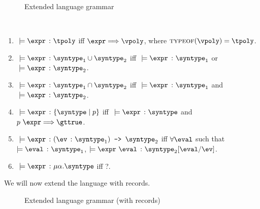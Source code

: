 \begin{figure}[hbt!]%
  \begin{grammar}
            \grule[expressions]{\expr}{
              \cdots
              \gor \vpoly
            }
            \grule[values]{\eval}{
              \cdots
              \gor \vpoly
            }
            \grule[types]{\syntype}{
              \cdots
              \gor \tpoly
              \gor \mkunion{\syntype}{\syntype}
              \gor \mkintersect{\syntype}{\syntype}
              \gor \mktset{\syntype}{\expr}
              \gor \mkdfun{\ev}{\syntype}{\syntype}
              \gor \mkmiu{\alpha}{\syntype}
          }
        \end{grammar}
    \caption{Extended language grammar}
    \label{ext_Grammar}
\end{figure}

\begin{definition}
  \label{def_typingRulesExt}
  \ \par
  \begin{enumerate}
      \item $\ \models \hastype{\expr}{\tpoly}$ iff $\expr \bigstep \vpoly$, where $\textsc{typeof}(\vpoly) = \tpoly$.
      \item $\ \models \hastype{\expr}{\mkunion{\syntype_1}{\syntype_2}}$ iff $\ \models \hastype{\expr}{\syntype_1}$ or $\ \models \hastype{\expr}{\syntype_2}$.
      \item $\ \models \hastype{\expr}{\mkintersect{\syntype_1}{\syntype_2}}$ iff $\ \models \hastype{\expr}{\syntype_1}$ and $\ \models \hastype{\expr}{\syntype_2}$.
      \item $\ \models \hastype{\expr}{\mktset{\syntype}{p}}$ iff $\ \models \hastype{\expr}{\syntype}$ and $p \ \expr \Longrightarrow \gttrue$.
      \item $\ \models \hastype{\expr}{\mkdfun{\ev}{\syntype_1}{\syntype_2}}$ iff $\forall{\eval}$ such that $\models \hastype{\eval}{\syntype_1}$, $\models \hastype{\expr\ \eval}{\substitute{\syntype_2}{\eval}{\ev}}$.
      \item $\ \models \hastype{\expr}{\mkmiu{\alpha}{\syntype}}$ iff ?.
  \end{enumerate}
\end{definition}

We will now extend the language with records.


\begin{figure}[hbt!]%
  \begin{grammar}
            \grule[values]{\eval}{
              \cdots
              \gor \{\overline{\elbl = \eval}\}^{\{\overline{\elbl}\}}
            }
            \grule[types]{\syntype}{
              \cdots
              \gor \{\overline{\hastype{\elbl}{\syntype}}\} 
          }
        \end{grammar}
    \caption{Extended language grammar (with records)}
    \label{rec_Grammar}
\end{figure}

